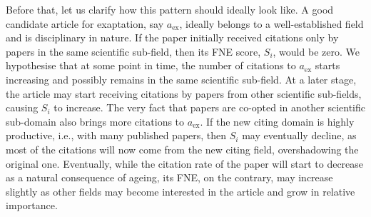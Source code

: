\documentclass[draft,final]{vutinfth} %
\begin{document}
Before that, let us clarify how this pattern should ideally look like. 
A good candidate article for exaptation, say $a_\mathrm{ex}$, ideally belongs to a well-established field and is disciplinary in nature. 
If the paper initially received citations only by papers in the same scientific sub-field, then its FNE score, $S_i$, would be zero. 
We hypothesise that at some point in time, the number of citations to $a_\mathrm{ex}$ starts increasing and possibly remains in the same scientific sub-field. 
At a later stage, the article may start receiving citations by papers from other scientific sub-fields, causing $S_i$ to increase. 
The very fact that papers are co-opted in another scientific sub-domain also brings more citations to $a_\mathrm{ex}$. 
%
If the new citing domain is highly productive, i.e., with many published papers, then $S_i$ may eventually decline, as most of the citations will now come from the new citing field, overshadowing the original one. 
Eventually, while the citation rate of the paper will start to decrease as a natural consequence of ageing, its FNE, on the contrary, may increase slightly as other fields may become interested in the article and grow in relative importance.
\end{document}
